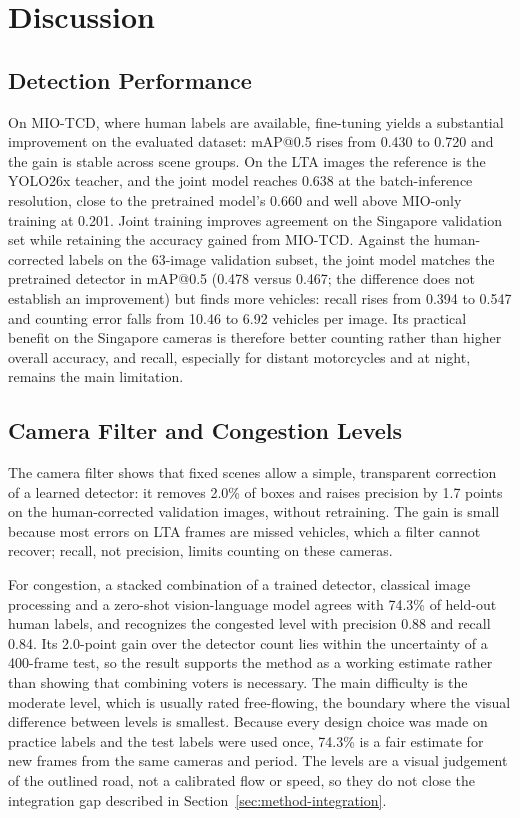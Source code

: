 \section{Discussion}\label{sec:discussion}

\subsection{Detection Performance}\label{sec:discussion-detection}

On MIO-TCD, where human labels are available, fine-tuning yields a substantial
improvement on the evaluated dataset: mAP@0.5 rises from 0.430 to 0.720 and the
gain is stable across scene groups. On the LTA images the reference is the
YOLO26x teacher, and the joint model reaches 0.638 at the batch-inference
resolution, close to the pretrained model's 0.660 and well above MIO-only
training at 0.201. Joint training improves agreement on the Singapore validation
set while retaining the accuracy gained from MIO-TCD. Against the human-corrected labels on
the 63-image validation subset, the joint model matches the pretrained detector in mAP@0.5 (0.478
versus 0.467; the difference does not establish an improvement) but finds more vehicles: recall
rises from 0.394 to 0.547 and counting error falls from 10.46 to 6.92 vehicles
per image. Its practical benefit on the Singapore cameras is therefore better
counting rather than higher overall accuracy, and recall, especially for distant
motorcycles and at night, remains the main limitation.

\subsection{Camera Filter and Congestion Levels}\label{sec:discussion-congestion}

The camera filter shows that fixed scenes allow a simple, transparent correction
of a learned detector: it removes 2.0\% of boxes and raises precision by 1.7
points on the human-corrected validation images, without retraining. The gain is small
because most errors on LTA frames are missed vehicles, which a filter cannot
recover; recall, not precision, limits counting on these cameras.

For congestion, a stacked combination of a trained detector, classical image
processing and a zero-shot vision-language model agrees with 74.3\% of held-out
human labels, and recognizes the congested level with precision 0.88 and recall
0.84. Its 2.0-point gain over the detector count lies within the uncertainty of a
400-frame test, so the result supports the method as a working estimate rather
than showing that combining voters is necessary. The main difficulty is the
moderate level, which is usually rated free-flowing, the boundary where the
visual difference between levels is smallest. Because every design choice was
made on practice labels and the test labels were used once, 74.3\% is a fair
estimate for new frames from the same cameras and period. The levels are a
visual judgement of the outlined road, not a calibrated flow or speed, so they do
not close the integration gap described in Section~\ref{sec:method-integration}.

